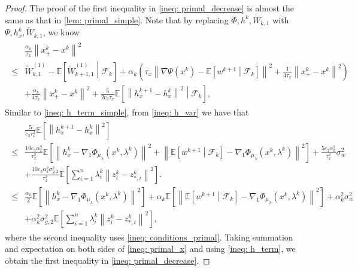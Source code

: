 \documentclass[10pt]{article}
\theoremstyle{remark}
\def\setF{\mathscr{F}} %
\newcommand{\E}{\mathbb{E}}
\newcommand{\norm}[1]{\left\|#1\right\|}
\begin{document}
\begin{proof}
The proof of the first inequality in \eqref{ineq: primal_decrease} is almost the same as that in \eqref{lem: primal_simple}. Note that by replacing $\Phi, h^k, W_{k,1}$ with $\Psi, h_x^k, \tilde W_{k,1}$, we know
\begin{align}\label{ineq: primal_x}
    \begin{aligned}
           &\frac{\alpha_k}{\tau_x}\norm{x_+^k-x^k}^2  \\
        \leq & \tilde W_{k,1}^{(1)} - \E\left[\tilde W_{k+1,1}^{(1)}\middle|\setF_k\right] + \alpha_k\left(\tau_x\norm{\nabla\Psi(x^k) - \E\left[w^{k+1}\middle|\setF_k\right]}^2 + \frac{1}{4\tau_x}\norm{ x_+^k - x^k}^2\right) \\
        & + \frac{\alpha_k}{4\tau_x}\norm{x_+^k-x^k}^2 + \frac{5}{2c_3\tau_x}\E\left[\norm{h_x^{k+1} - h_x^k}^2\middle|\setF_k\right],
    \end{aligned}
\end{align}
Similar to \eqref{ineq: h_term_simple}, from \eqref{ineq: h_var} we have that
\begin{align}\label{ineq: h_term}
    \begin{aligned}
        &\frac{5}{c_3\tau_x^2}\E\left[\norm{h_x^{k+1} - h_x^k}^2\right]  \\
        \leq &\frac{10c_3\alpha_k^2}{\tau_x^2}\E\left[\norm{h_x^k - \nabla_1\Phi_{\mu_{\lambda}}(x^k,\lambda^k)}^2 + \norm{\E\left[w^{k+1}\middle|\setF_k\right] -\nabla_1\Phi_{\mu_{\lambda}}(x^k,\lambda^k)}^2\right] + \frac{5c_3\alpha_k^2}{\tau_x^2}\sigma_w^2 \\
        & + \frac{10c_3\alpha_k^2\sigma_{g,2}^2}{\tau_x^2}\E\left[\sum_{i=1}^{n}\lambda_i^k\norm{z_i^k - z_{*,i}^k}^2\right]. \\
    \leq &\frac{\alpha_k}{2}\E\left[\norm{h_x^k - \nabla_1\Phi_{\mu_{\lambda}}(x^k,\lambda^k)}^2\right] + \alpha_k\E\left[\norm{\E\left[w^{k+1}\middle|\setF_k\right] -\nabla_1\Phi_{\mu_{\lambda}}(x^k,\lambda^k)}^2\right] + \alpha_k^2\sigma_w^2 \\
    & + \alpha_k^2\sigma_{g,2}^2\E\left[\sum_{i=1}^{n}\lambda_i^k\norm{z_i^k - z_{*,i}^k}^2\right], 
    \end{aligned}
\end{align}
where the second inequality uses \eqref{ineq: conditions_primal}. Taking summation and expectation on both sides of \eqref{ineq: primal_x} and using \eqref{ineq: h_term}, we obtain the first inequality in \eqref{ineq: primal_decrease}.

\end{proof}
\end{document}
